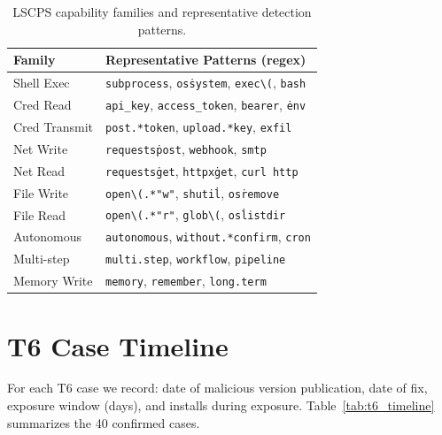 \begin{table}[h]
\centering
\caption{LSCPS capability families and representative detection patterns.}
\label{tab:lscps_kw}
\small
\begin{tabular}{@{}ll@{}}
\toprule
\textbf{Family} & \textbf{Representative Patterns (regex)} \\
\midrule
Shell Exec     & \texttt{subprocess}, \texttt{os\.system}, \texttt{exec\textbackslash(}, \texttt{bash} \\
Cred Read      & \texttt{api\_key}, \texttt{access\_token}, \texttt{bearer}, \texttt{\.env} \\
Cred Transmit  & \texttt{post.*token}, \texttt{upload.*key}, \texttt{exfil} \\
Net Write      & \texttt{requests\.post}, \texttt{webhook}, \texttt{smtp} \\
Net Read       & \texttt{requests\.get}, \texttt{httpx\.get}, \texttt{curl http} \\
File Write     & \texttt{open\textbackslash(.*"w"}, \texttt{shutil\.}, \texttt{os\.remove} \\
File Read      & \texttt{open\textbackslash(.*"r"}, \texttt{glob\textbackslash(}, \texttt{os\.listdir} \\
Autonomous     & \texttt{autonomous}, \texttt{without.*confirm}, \texttt{cron} \\
Multi-step     & \texttt{multi.step}, \texttt{workflow}, \texttt{pipeline} \\
Memory Write   & \texttt{memory}, \texttt{remember}, \texttt{long.term} \\
\bottomrule
\end{tabular}
\end{table}

\section{T6 Case Timeline}
\label{app:t6_timeline}

For each T6 case we record: date of malicious version publication,
date of fix, exposure window (days), and installs during exposure.
Table~\ref{tab:t6_timeline} summarizes the 40 confirmed cases.

